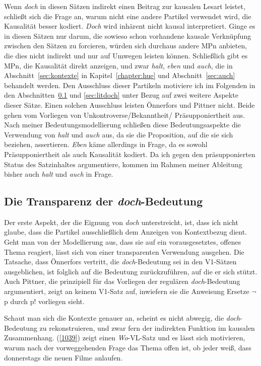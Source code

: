 {Wenn \textit{doch} in diesen Sätzen indirekt einen Beitrag zur kausalen Lesart leistet, schließt sich die Frage an, warum nicht eine andere Partikel verwendet wird, die Kausalität besser kodiert. \textit{Doch} wird inhärent nicht kausal interpretiert. Ginge es in diesen Sätzen nur darum, die sowieso schon vorhandene kausale Verknüpfung zwischen den Sätzen zu forcieren, würden sich durchaus andere MPn anbieten, die dies nicht indirekt und nur auf Umwegen leisten können. Schließlich gibt es MPn, die Kausalität direkt anzeigen, und zwar \textit{halt}, \textit{eben} und \textit{auch}, die in Abschnitt~\ref{sec:kontexte} in Kapitel~\ref{chapter:hue} und Abschnitt~\ref{sec:auch} behandelt werden. Den Ausschluss dieser Partikeln motiviere ich im Folgenden in den Abschnitten~\ref{sec:transdoch} und \ref{sec:litdoch} unter Bezug auf zwei weitere Aspekte dieser Sätze. Einen solchen Ausschluss leisten Önnerfors und Pittner nicht. Beide gehen vom Vorliegen von Unkontroverse/Bekanntheit/ Präsupponiertheit aus. Nach meiner Bedeutungsmodellierung schließen diese Bedeutungsaspekte die Verwendung von \textit{halt} und \textit{auch} aus, da sie die Proposition, auf die sie sich beziehen, assertieren. \textit{Eben} käme allerdings in Frage, da es sowohl Präsupponiertheit als auch Kausa\-lität kodiert. Da ich gegen den präsupponierten Status des Satzinhaltes argumentiere, kommen im Rahmen meiner Ableitung bisher auch \textit{halt} und \textit{auch} in Frage.

\subsection{Die Transparenz der \textit{doch}-Bedeutung}
\label{sec:transdoch}
Der erste Aspekt, der die Eignung von \textit{doch} unterstreicht, ist, dass ich nicht glaube, dass die Partikel ausschließlich dem Anzeigen von Kontextbezug dient. Geht man von der Modellierung aus, dass sie auf ein vorausgesetztes, offenes Thema reagiert, lässt sich von einer transparenten Verwendung ausgehen. Die Tatsache, dass Önnerfors vertritt, die \textit{doch}-Bedeutung sei in den V1-Sätzen ausgeblichen, ist folglich auf die Bedeutung zurückzuführen, auf die er sich stützt. Auch Pittner, die prinzipiell für das Vorliegen der regulären \textit{doch}-Bedeutung argumentiert, zeigt an keinem V1-Satz auf, inwiefern sie die Anweisung \glq Ersetze $\neg$p durch p!\grq {} vorliegen sieht.

Schaut man sich die Kontexte genauer an, scheint es nicht abwegig, die \textit{doch}-Bedeutung zu rekonstruieren, und zwar fern der indirekten Funktion im kausalen Zusammenhang. (\ref{1039}) zeigt einen \textit{Wo}-VL-Satz und es lässt sich motivieren, warum nach der vorweggehenden Frage das Thema offen ist, ob jeder weiß, dass donnerstags die neuen Filme anlaufen.

}
